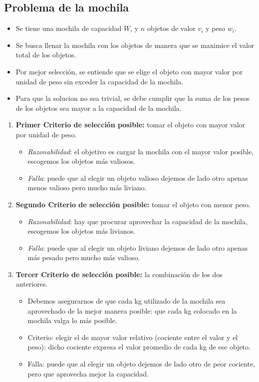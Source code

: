 \subsection{Problema de la mochila}

\begin{itemize}
    \item Se tiene una mochila de capacidad $W$, y $n$ objetos de valor $v_i$ y peso $w_i$.
    \item Se busca llenar la mochila con los objetos de manera que se maximice el valor total de los objetos.
    \item Por mejor selección, se entiende que se elige el objeto con mayor valor por unidad de peso sin exceder la capacidad de la mochila.
    \item Para que la solucion no sea trivial, se debe cumplir que la suma de los pesos de los objetos sea mayor a la capacidad de la mochila.
\end{itemize}

\begin{enumerate}
    \item \textbf{Primer Criterio de selección posible:} tomar el objeto con mayor valor por unidad de peso.
    \begin{itemize}
        \item \textit{Razonabilidad}: el objetivo es cargar la mochila con el mayor valor posible, escogemos los objetos más valiosos.
        \item \textit{Falla}: puede que al elegir un objeto valioso dejemos de lado otro apenas menos valioso pero mucho más liviano.
    \end{itemize}
    \item \textbf{Segundo Criterio de selección posible:} tomar el objeto con menor peso.
    \begin{itemize}
        \item \textit{Razonabilidad}: hay que procurar aprovechar la capacidad de la mochila, escogemos los objetos más livianos.
        \item \textit{Falla}: puede que al elegir un objeto liviano dejemos de lado otro apenas más pesado pero mucho más valioso.
    \end{itemize}
    \item \textbf{Tercer Criterio de selección posible:} la combinación de los dos anteriores.
    \begin{itemize}
        \item Debemos asegurarnos de que cada kg utilizado de la mochila sea aprovechado de la mejor manera posible: que cada kg colocado en la mochila valga lo más posible.
        \item Criterio: elegir el de mayor valor relativo (cociente entre el valor y el peso): dicho cociente expresa el valor promedio de cada kg de ese objeto.
        \item Falla: puede que al elegir un objeto dejemos de lado otro de peor cociente, pero que aprovecha mejor la capacidad.
    \end{itemize}
\end{enumerate}

